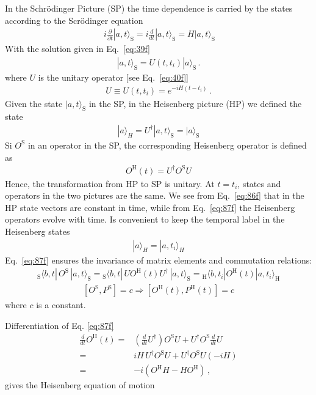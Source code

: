 In the Schr\"odinger Picture (SP) the time dependence is carried by the states according to the Scr\"odinger equation 
\begin{align}\
\label{eq:84f}
  i\frac{\partial}{\partial t}|a,t\rangle_{\text{S}}=  i\frac{d}{dt}|a,t\rangle_{\text{S}}=  {H}|a,t\rangle_{\text{S}}
\end{align}
With the solution given in Eq.~\eqref{eq:39f}
\begin{align}
\label{eq:85f}
    |a,t\rangle_{\text{S}}=U(t,t_i)|a\rangle_{\text{S}}\,.
\end{align}
where $U$ is the unitary operator [see Eq.~\eqref{eq:40f}]
\begin{align}
 U\equiv U(t,t_i)= e^{-i H(t-t_i)}\,.
\end{align}
Given the state $|a,t\rangle_{\text{S}}$ in the SP, in the Heisenberg picture (HP) we defined the state
\begin{align}
\label{eq:86f}
  |a\rangle_H=U^\dagger|a,t\rangle_{\text{S}}=|a\rangle_{\text{S}}
\end{align}
Si $O^{\text{S}}$ in an operator in the SP, the corresponding Heisenberg operator is defined as
\begin{align}
\label{eq:87f}
  O^{\text{H}}(t)=U^\dagger O^{\text{S}}U
\end{align}
Hence, the transformation from HP to SP is unitary. At $t=t_i$, states and operators in the two pictures are the same. We see from Eq.~\eqref{eq:86f} that in the HP state vectors are constant in time, while from Eq.~\eqref{eq:87f} the Heisenberg operators evolve with time. Is convenient to keep the temporal label in the Heisenberg states
\begin{align}
  |a\rangle_H=|a,t_i\rangle_H
\end{align}
Eq.~\eqref{eq:87f} ensures the invariance of matrix elements and commutation relations:
\begin{align}
  {}_{\text{S}}\langle b,t|\,O^{\text{S}}\,|a,t\rangle_{\text{S}}=  {}_{\text{S}}\langle b,t|\,U O^{\text{H}}(t) U^\dagger\,|a,t\rangle_{\text{S}}=
{}_{\text{H}}\langle b,t_i|O^{\text{H}}(t)|a,t_i\rangle_{\text{H}}
\end{align}
\begin{align}
\left[O^{\text{S}},P^{\text{S}}\right]=c\Rightarrow\left[O^{\text{H}}(t),P^{\text{H}}(t)\right]=c
\end{align}
where $c$ is a constant.

Differentiation of Eq. \eqref{eq:87f} 
\begin{align}
  \frac{d}{dt}O^{\text{H}}(t)=&\left(\frac{d}{dt}U^\dagger\right)O^{\text{S}}U+
U^\dagger O^{\text{S}}\frac{d}{dt}U\nonumber\\
 =&i H\, U^\dagger O^{\text{S}}U+
U^\dagger O^{\text{S}}U(-i H)\nonumber\\
 =&-i ( O^{\text{H}}H-H O^{\text{H}})\,,
\end{align}
gives the Heisenberg equation of motion

